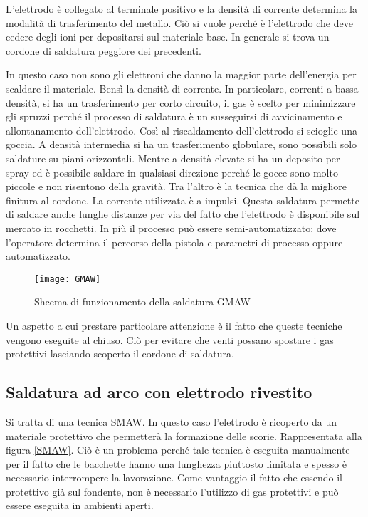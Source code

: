 L'elettrodo è collegato al terminale positivo e la densità di corrente determina la modalità di trasferimento del metallo.
Ciò si vuole perché è l'elettrodo che deve cedere degli ioni per depositarsi sul materiale base. In generale si trova un cordone di saldatura peggiore dei precedenti.

In questo caso non sono gli elettroni che danno la maggior parte dell'energia per scaldare il materiale. Bensì la densità di corrente.
In particolare, correnti a bassa densità, si ha un trasferimento per corto circuito, il gas è scelto per minimizzare gli spruzzi perché il processo di saldatura è un susseguirsi di avvicinamento e allontanamento dell'elettrodo. Così al riscaldamento dell'elettrodo si scioglie una goccia.
A densità intermedia si ha un trasferimento globulare, sono possibili solo saldature su piani orizzontali.
Mentre a densità elevate si ha un deposito per spray ed è possibile saldare in qualsiasi direzione perché le gocce sono molto piccole e non risentono della gravità. Tra l'altro è la tecnica che dà la migliore finitura al cordone.
La corrente utilizzata è a impulsi.
Questa saldatura permette di saldare anche lunghe distanze per via del fatto che l'elettrodo è disponibile sul mercato in rocchetti.
In più il processo può essere semi-automatizzato: dove l'operatore determina il percorso della pistola e parametri di processo oppure automatizzato.

\begin{figure}
\centering
\texttt{[image: GMAW]}
\caption{Shcema di funzionamento della saldatura \ac{GMAW}}
\label{fig:GMAW}
\end{figure}

Un aspetto a cui prestare particolare attenzione è il fatto che queste tecniche vengono eseguite al chiuso. Ciò per evitare che venti possano spostare i gas protettivi lasciando scoperto il cordone di saldatura.

\subsection{Saldatura ad arco con elettrodo rivestito}
Si tratta di una tecnica \ac{SMAW}. In questo caso l'elettrodo è ricoperto da un materiale protettivo che permetterà la formazione delle scorie.
Rappresentata alla figura \ref{SMAW}.
Ciò è un problema perché tale tecnica è eseguita manualmente per il fatto che le bacchette hanno una lunghezza piuttosto limitata e spesso è necessario interrompere la lavorazione.
Come vantaggio il fatto che essendo il protettivo già sul fondente, non è necessario l'utilizzo di gas protettivi e può essere eseguita in ambienti aperti.

